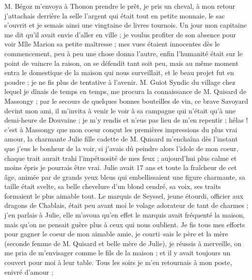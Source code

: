 \documentclass[12pt]{article}
\begin{document}
 M. Bégoz m’envoya à Thonon prendre le prêt, je pris un
cheval, à mon retour j’attachais derrière la selle l’argent qui était tout en petite monnaie, le sac
s’ouvrit et je semais ainsi une vingtaine de livres tournois. Un jour mon capitaine me dit qu’il
avait envie d’aller en ville ; je voulus profiter de son absence pour voir Mlle Marion sa petite
maîtresse ; mes vues étaient innocentes dès le commencement, peu à peu une chose donna l’autre,
enfin l’humanité était sur le point de vaincre la raison, on se défendit tant soit peu, mais au même
moment entra le domestique de la maison qui nous surveillait, et le beau projet fut en poudre ; je
ne fis plus de tentative à l’avenir. M. Guiot Syndic du village chez lequel je dînais de temps en
temps, me procura la connaissance de M. Quisard de Massongy ; par le secours de quelques bonnes
bouteilles de vin, ce brave Savoyard devint mon ami, il m’invita à venir le voir à sa campagne qui
n’était qu’à une demi-heure de Douvaine ; je m’y rendis et n’eus pas lieu de m’en repentir ; hélas !
c’est à Massongy que mon coeur conçut les premières impressions du plus vrai amour, la charmante
Julie fille cadette de M. Quisard m’enchaîna dès l’instant que j’eus le bonheur de la voir, si
j’avais dû peindre alors l’idole de mon coeur, chaque trait aurait trahi l’impétuosité de mes feux ;
aujourd’hui plus calme et moins épris je pourrais être vrai. Julie avait 17 ans et toute la
fraîcheur de cet âge, animée par de grands yeux bleus qui embellissaient une figure charmante, sa
taille était svelte, sa belle chevelure d’un blond cendré, sa voix, ses traits formaient le plus
aimable tout. Le marquis de Seyssel, jeune étourdi, officier aux dragons de Chablais, était peu
avant moi le volage adorateur de tant de charmes ; j’en parlais à Julie, elle m’avoua qu’en effet le
marquis avait fréquenté la maison, mais qu’on ne pensait guère plus à ceux qui nous oublient. Je fis
tous mes efforts pour gagner le coeur de mon aimable amie, je courti–sais le père et la mère
(seconde femme de M. Quisard et belle mère de Julie), je réussis à merveille, on me pria de
m’envisager comme le fils de la maison ; et il y avait toujours un couvert pour moi à leur table.
Tous les soirs je m’en retournais à mon poste, enivré d’amour ;
\end{document}
